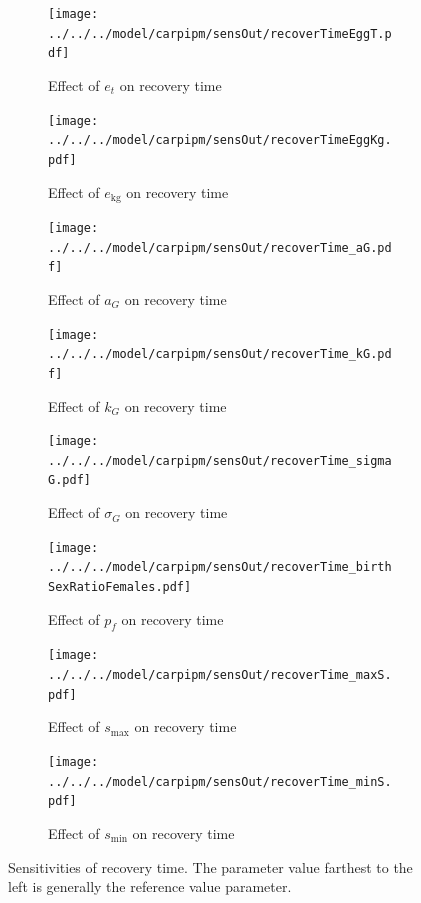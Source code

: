 \documentclass{article}[12pt]
\begin{document}
\begin{figure}[htbp]
	\centering
	\begin{subfigure}[b]{0.45\textwidth}
	   \texttt{[image: ../../../model/carpipm/sensOut/recoverTimeEggT.pdf]} %
	   \caption{Effect of  \(e_t\) on recovery time}
	   \label{fig:ET_RT}
	\end{subfigure}
	\centering
	\begin{subfigure}[b]{0.45\textwidth}
	   \texttt{[image: ../../../model/carpipm/sensOut/recoverTimeEggKg.pdf]} %
	   \caption{Effect of  \(e_\text{kg}\) on recovery time}
	   \label{fig:Ekg_RT}
	\end{subfigure}
	\begin{subfigure}[b]{0.45\textwidth}
	   \texttt{[image: ../../../model/carpipm/sensOut/recoverTime\_aG.pdf]} %
	   \caption{Effect of  \(a_G\) on recovery time}
	   \label{fig:aG_RT}
	\end{subfigure}
	\begin{subfigure}[b]{0.45\textwidth}
	   \texttt{[image: ../../../model/carpipm/sensOut/recoverTime\_kG.pdf]} %
	   \caption{Effect of  \(k_G\) on recovery time}
	   \label{fig:kG_RT}
	\end{subfigure}
	\begin{subfigure}[b]{0.45\textwidth}
	   \texttt{[image: ../../../model/carpipm/sensOut/recoverTime\_sigmaG.pdf]} %
	   \caption{Effect of  \(\sigma_G\) on recovery time}
	   \label{fig:sigmaG_RT}
	\end{subfigure}
	\begin{subfigure}[b]{0.45\textwidth}
	   \texttt{[image: ../../../model/carpipm/sensOut/recoverTime\_birthSexRatioFemales.pdf]} %
	   \caption{Effect of  \(p_f\) on recovery time}
	   \label{fig:pF_RT}
	\end{subfigure}	
	\begin{subfigure}[b]{0.45\textwidth}
	   \texttt{[image: ../../../model/carpipm/sensOut/recoverTime\_maxS.pdf]} %
	   \caption{Effect of  \(s_\text{max}\) on recovery time}
	   \label{fig:maxS_RT}
	\end{subfigure}		
	\begin{subfigure}[b]{0.45\textwidth}
	   \texttt{[image: ../../../model/carpipm/sensOut/recoverTime\_minS.pdf]} %
	   \caption{Effect of  \(s_\text{min}\) on recovery time}
	   \label{fig:minS_RT}
	\end{subfigure}		
     \caption{Sensitivities of  recovery time. The parameter value farthest to the left is generally the reference value parameter.}
   \label{fig:recoveryTimes}
\end{figure}
\end{document}
